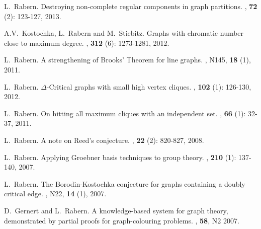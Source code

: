 \documentclass[margin,line]{res}
\begin{document}
\begin{resume}
\begin{enumerate}[{[}1{]}]
\smallskip

\item
L.~Rabern.
\newblock Destroying non-complete regular components in graph partitions.
, \textbf{72} (2): 123-127, 2013.

\smallskip

\item A.V.~Kostochka, L.~Rabern and M.~Stiebitz.
\newblock Graphs with chromatic number close to maximum degree.
,  \textbf{312} (6): 1273-1281, 2012.

\smallskip

\item L.~Rabern.
\newblock A strengthening of Brooks' Theorem for line graphs.
, N145, \textbf{18} (1), 2011.

\smallskip

\item L.~Rabern.
\newblock $\Delta$-Critical graphs with small high vertex cliques.
, \textbf{102} (1): 126-130, 2012.

\smallskip

\item L.~Rabern. 
\newblock On hitting all maximum cliques with an independent set.
, \textbf{66} (1): 32-37, 2011.

\smallskip

\item L.~Rabern.
\newblock A note on Reed's conjecture.
, \textbf{22} (2): 820-827, 
	2008.

\smallskip

\item L.~Rabern.
\newblock Applying Groebner basis techniques to group theory.
, \textbf{210} (1): 137-140, 2007.

\smallskip

\item
L.~Rabern.
\newblock The Borodin-Kostochka conjecture for graphs containing a doubly critical edge.
, N22, \textbf{14} (1), 2007.

\smallskip

\item
D.~Gernert and L.~Rabern.
\newblock A knowledge-based system for graph theory, demonstrated by partial proofs for graph-colouring problems.
, \textbf{58}, N2 2007.


\end{enumerate}
\end{resume}
\end{document}
